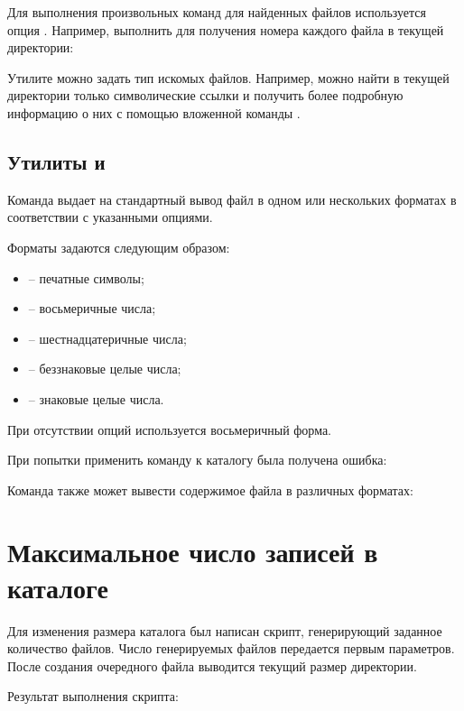 Для выполнения произвольных команд для найденных файлов используется опция . Например, выполнить  для получения номера  каждого файла в текущей директории:


Утилите  можно задать тип искомых файлов. Например, можно найти в текущей директории только символические ссылки и получить более подробную информацию о них с помощью вложенной команды .


\subsection{Утилиты  и }

Команда  выдает на стандартный вывод файл в одном или нескольких форматах в соответствии с указанными опциями. 

Форматы задаются следующим образом:
\begin{itemize}
	\item {} -- печатные символы;
	\item {} -- восьмеричные числа;
	\item {} -- шестнадцатеричные числа;
	\item {} -- беззнаковые целые числа;
	\item {} -- знаковые целые числа.
\end{itemize}

При отсутствии опций используется восьмеричный форма.


При попытки применить команду к каталогу была получена ошибка:


Команда  также может вывести содержимое файла в различных форматах:


\section{Максимальное число записей в каталоге}

Для изменения размера каталога был написан скрипт, генерирующий заданное количество файлов. Число генерируемых файлов передается первым параметров. После создания очередного файла выводится текущий размер директории.


Результат выполнения скрипта:


